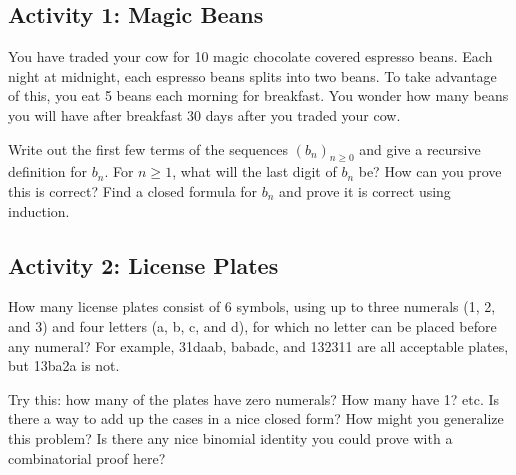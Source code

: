 \documentclass[11pt]{exam}
\begin{document}

\subsection*{Activity 1: Magic Beans}

You have traded your cow for 10 magic chocolate covered espresso beans.  Each night at midnight, each espresso beans splits into two beans.  To take advantage of this, you eat 5 beans each morning for breakfast.  You wonder how many beans you will have after breakfast 30 days after you traded your cow.

\begin{questions}
  \question Write out the first few terms of the sequences $(b_n)_{n \ge 0}$ and give a recursive definition for $b_n$.
  \vfill
  \question For $n \ge 1$, what will the last digit of $b_n$ be?  How can you prove this is correct?
  \vfill
  \question Find a closed formula for $b_n$ and prove it is correct using induction.
  \vfill
  \vfill
\end{questions}


\newpage

\subsection*{Activity 2: License Plates}

How many license plates consist of 6 symbols, using up to three numerals (1, 2, and 3) and four letters (a, b, c, and d), for which no letter can be placed before any numeral?  For example, 31daab, babadc, and 132311 are all acceptable plates, but 13ba2a is not.
\begin{questions}
  \question Try this: how many of the plates have zero numerals?  How many have 1?  etc.
\vfill
\vfill
  \question Is there a way to add up the cases in a nice closed form?
  \vfill
  \vfill
  \question How might you generalize this problem?  Is there any nice binomial identity you could prove with a combinatorial proof here?
  \vfill
\end{questions}
\end{document}
